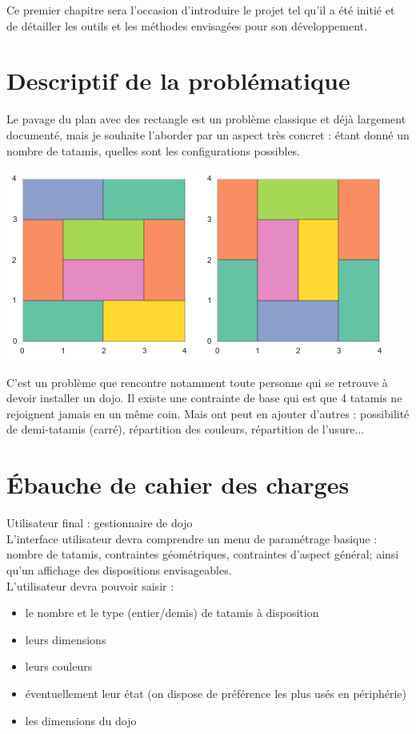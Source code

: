 \begin{summary}
    Ce premier chapitre sera l'occasion d'introduire le projet tel qu'il a été initié et de 
    détailler les outils et les méthodes envisagées pour son développement.
  \end{summary}

\section{Descriptif de la problématique}


Le pavage du plan avec des rectangle est un problème classique et déjà largement documenté,
mais je souhaite l'aborder par un aspect très concret : étant donné un nombre de tatamis, quelles sont les
configurations possibles.\\
\begin{center}
    \includegraphics[width = 0.5\linewidth]{./images/pavage-par-tatamis.png}
\end{center}
C'est un problème que rencontre notamment toute personne qui se retrouve à devoir installer un dojo.
Il existe une contrainte de base qui est que 4 tatamis ne rejoignent jamais en un même coin. Mais ont peut
en ajouter d'autres : possibilité de demi-tatamis (carré), répartition des couleurs, répartition de l'usure...

\section{Ébauche de cahier des charges}

Utilisateur final : gestionnaire de dojo\\

L'interface utilisateur devra comprendre un menu de paramétrage basique : nombre de tatamis,
contraintes géométriques, contraintes d'aspect général; ainsi qu'un affichage des dispositions envisageables.\\

L'utilisateur devra pouvoir saisir :

\begin{itemize}
    \item le nombre et le type (entier/demis) de tatamis à disposition
    \item leurs dimensions
    \item leurs couleurs
    \item éventuellement leur état (on dispose de préférence les plus usés en périphérie)
    \item les dimensions du dojo
\end{itemize}

